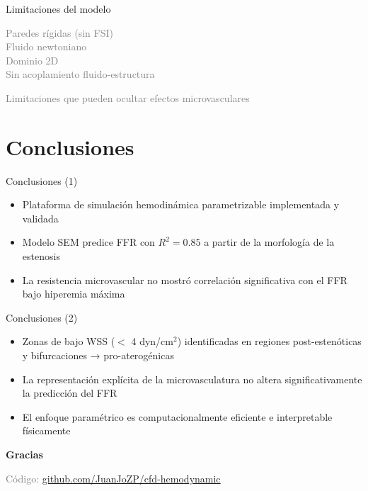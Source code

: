 \documentclass[aspectratio=169, 11pt]{beamer}
\begin{document}
\begin{frame}{Limitaciones del modelo}

  \centering
  \vfill
  \textcolor{gray}{Paredes rígidas (sin FSI)} \\
  \textcolor{gray}{Fluido newtoniano} \\
  \textcolor{gray}{Dominio 2D} \\
  \textcolor{gray}{Sin acoplamiento fluido-estructura}

  \vspace{0.3cm}
  \textcolor{gray}{\small Limitaciones que pueden ocultar efectos microvasculares}
  \vfill
\end{frame}

\section{Conclusiones}

\begin{frame}{Conclusiones (1)}
  \begin{itemize}
    \item {\color{gray} Plataforma de simulaci\'on hemodin\'amica parametrizable implementada y validada}
    \item {\color{gray} Modelo SEM predice FFR con $R^2 = 0.85$ a partir de la morfología de la estenosis}
    \item {\color{gray} La resistencia microvascular no mostró correlación significativa con el FFR bajo hiperemia máxima}
  \end{itemize}
\end{frame}

\begin{frame}{Conclusiones (2)}
  \begin{itemize}
    \item {\color{gray} Zonas de bajo WSS ($<$ 4 dyn/cm$^2$) identificadas en regiones post-estenóticas y bifurcaciones → pro-aterogénicas}
    \item {\color{gray} La representaci\'on expl\'icita de la microvasculatura no altera significativamente la predicci\'on del FFR}
    \item {\color{gray} El enfoque param\'etrico es computacionalmente eficiente e interpretable f\'isicamente}
  \end{itemize}
\end{frame}

\begin{frame}[plain]
  \centering
  \vfill
  {\Large\textbf{Gracias}}

  \vspace{0.5cm}
  \textcolor{gray}{Código: \href{https://github.com/JuanJoZP/cfd-hemodynamic}{github.com/JuanJoZP/cfd-hemodynamic}}

  \vfill
\end{frame}
\end{document}
